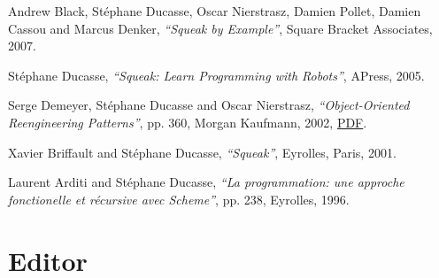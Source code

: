 \documentclass{article}
\newcommand{\czauthors}[1]{#1}
\newcommand{\cztitle}[1]{\emph{``#1''}}
\begin{document}
\begin{itemize}
	\pub  \czauthors{Andrew Black, St\'ephane Ducasse, Oscar Nierstrasz, Damien Pollet, Damien Cassou and Marcus Denker},  \cztitle{Squeak by Example}, Square Bracket Associates, 2007.

	\pub  \czauthors{St\'ephane Ducasse},  \cztitle{Squeak: Learn Programming with Robots}, APress, 2005.

	\pub  \czauthors{Serge Demeyer, St\'ephane Ducasse and Oscar Nierstrasz},  \cztitle{Object-Oriented Reengineering Patterns}, pp. 360, Morgan Kaufmann, 2002, \href{http://rmod-files.lille.inria.fr/Team/Books/OORP.pdf}{PDF}.

	\pub  \czauthors{Xavier Briffault and St\'ephane Ducasse},  \cztitle{Squeak}, Eyrolles, Paris, 2001.

	\pub  \czauthors{Laurent Arditi and St\'ephane Ducasse},  \cztitle{La programmation: une approche fonctionelle et r\'ecursive avec Scheme}, pp. 238, Eyrolles, 1996.

\end{itemize}\section{Editor}
\end{document}
